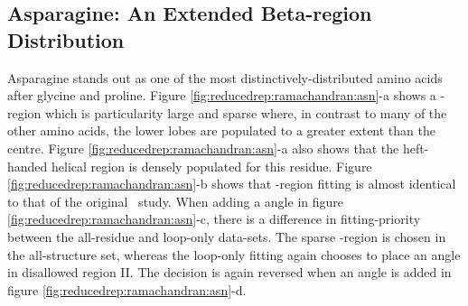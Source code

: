 \subsection{Asparagine: An Extended Beta-region Distribution}

Asparagine stands out as one of the most distinctively-distributed amino acids after glycine and proline. Figure \ref{fig:reducedrep:ramachandran:asn}-a shows a \be-region which is particularity large and sparse where, in contrast to many of the other amino acids, the lower lobes are populated to a greater extent than the centre. Figure \ref{fig:reducedrep:ramachandran:asn}-a also shows that the heft-handed helical region is densely populated for this residue. Figure \ref{fig:reducedrep:ramachandran:asn}-b shows that \be-region fitting is almost identical to that of the original \raft\ study. When adding a  angle in figure \ref{fig:reducedrep:ramachandran:asn}-c, there is a difference in fitting-priority between the all-residue and loop-only data-sets. The sparse \be-region is chosen in the all-structure set, whereas the loop-only fitting again chooses to place an angle in disallowed region II. The decision is again reversed when an  angle is added in figure \ref{fig:reducedrep:ramachandran:asn}-d.


